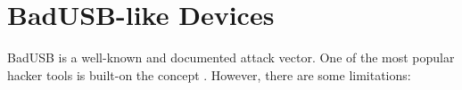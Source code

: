 


\section{BadUSB-like Devices} \label{badusbdevices}


BadUSB is a well-known and documented attack vector. One of the most popular hacker tools is built-on the concept \autocite{hak5BashBunny}. However, there are some limitations:

